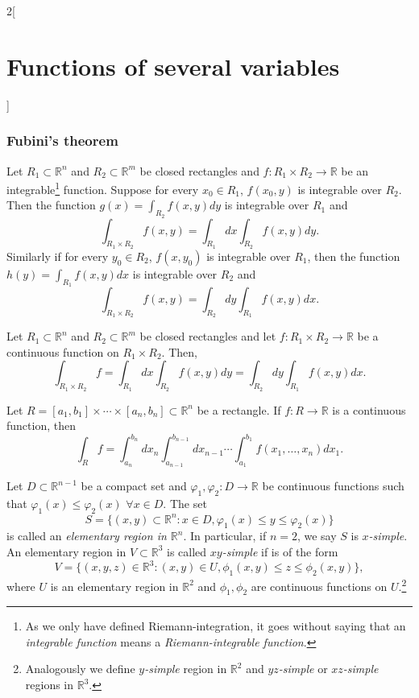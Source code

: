 \documentclass[class=article,10pt,crop=false]{standalone}
\begin{document}
\begin{multicols}{2}[\section{Functions of several variables}]
\subsubsection{Fubini's theorem}
\begin{theorem}
Let $R_1\subset\mathbb{R}^n$ and $R_2\subset\mathbb{R}^m$ be closed rectangles and $f:R_1\times R_2\rightarrow\mathbb{R}$ be an integrable\footnote{As we only have defined Riemann-integration, it goes without saying that an \textit{integrable function} means a \textit{Riemann-integrable function}.} function. Suppose for every $x_0\in R_1$, $f(x_0,y)$ is integrable over $R_2$. Then the function $\displaystyle g(x)=\int_{R_2}f(x,y)dy$ is integrable over $R_1$ and $$\int_{R_1\times R_2}f(x,y)=\int_{R_1}dx\int_{R_2}f(x,y)dy.$$ Similarly if for every $y_0\in R_2$, $f(x,y_0)$ is integrable over $R_1$, then the function $\displaystyle h(y)=\int_{R_1}f(x,y)dx$ is integrable over $R_2$ and $$\int_{R_1\times R_2}f(x,y)=\int_{R_2}dy\int_{R_1}f(x,y)dx.$$
\begin{corollary}
Let $R_1\subset\mathbb{R}^n$ and $R_2\subset\mathbb{R}^m$ be closed rectangles and let $f:R_1\times R_2\rightarrow\mathbb{R}$ be a continuous function on $R_1\times R_2$. Then, $$\int_{R_1\times R_2}f=\int_{R_1}dx\int_{R_2}f(x,y)dy=\int_{R_2}dy\int_{R_1}f(x,y)dx.$$
\end{corollary}
\begin{corollary}
Let $R=[a_1,b_1]\times\cdots\times[a_n,b_n]\subset\mathbb{R}^n$ be a rectangle. If $f:R\rightarrow\mathbb{R}$ is a continuous function, then $$\int_Rf=\int_{a_n}^{b_n}dx_n\int_{a_{n-1}}^{b_{n-1}}dx_{n-1}\cdots\int_{a_1}^{b_1}f(x_1,\ldots,x_n)dx_1.$$
\end{corollary}
\begin{definition}
Let $D\subset\mathbb{R}^{n-1}$ be a compact set and $\varphi_1,\varphi_2:D\rightarrow\mathbb{R}$ be continuous functions such that $\varphi_1(x)\leq\varphi_2(x)$ $\forall x\in D$. The set $$S=\{(x,y)\subset\mathbb{R}^n:x\in D, \varphi_1(x)\leq y\leq\varphi_2(x)\}$$ is called an \textit{elementary region in $\mathbb{R}^n$}. In particular, if $n=2$, we say $S$ is \textit{$x$-simple}. An elementary region in $V\subset\mathbb{R}^3$ is called \textit{$xy$-simple} if is of the form $$V=\{(x,y,z)\in\mathbb{R}^3:(x,y)\in U, \phi_1(x,y)\leq z\leq\phi_2(x,y)\},$$ where $U$ is an elementary region in $\mathbb{R}^2$ and $\phi_1,\phi_2$ are continuous functions on $U$.\footnote{Analogously we define \textit{$y$-simple} region in $\mathbb{R}^2$ and \textit{$yz$-simple} or \textit{$xz$-simple} regions in $\mathbb{R}^3$.}

\end{definition}
\end{theorem}
\end{multicols}
\end{document}
